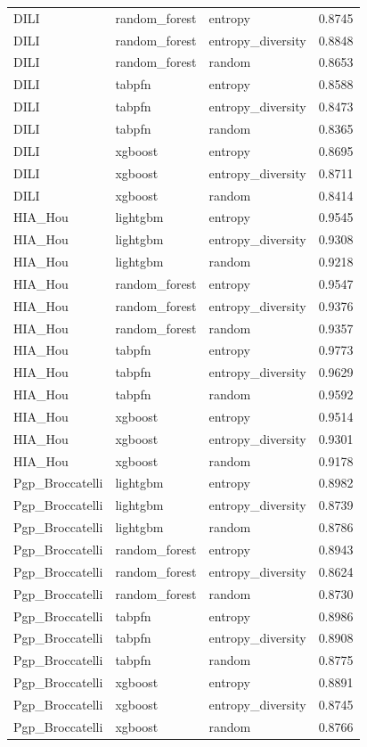 \begin{tabular}{lllr}
DILI & random_forest & entropy & 0.8745 \\
DILI & random_forest & entropy_diversity & 0.8848 \\
DILI & random_forest & random & 0.8653 \\
DILI & tabpfn & entropy & 0.8588 \\
DILI & tabpfn & entropy_diversity & 0.8473 \\
DILI & tabpfn & random & 0.8365 \\
DILI & xgboost & entropy & 0.8695 \\
DILI & xgboost & entropy_diversity & 0.8711 \\
DILI & xgboost & random & 0.8414 \\
HIA_Hou & lightgbm & entropy & 0.9545 \\
HIA_Hou & lightgbm & entropy_diversity & 0.9308 \\
HIA_Hou & lightgbm & random & 0.9218 \\
HIA_Hou & random_forest & entropy & 0.9547 \\
HIA_Hou & random_forest & entropy_diversity & 0.9376 \\
HIA_Hou & random_forest & random & 0.9357 \\
HIA_Hou & tabpfn & entropy & 0.9773 \\
HIA_Hou & tabpfn & entropy_diversity & 0.9629 \\
HIA_Hou & tabpfn & random & 0.9592 \\
HIA_Hou & xgboost & entropy & 0.9514 \\
HIA_Hou & xgboost & entropy_diversity & 0.9301 \\
HIA_Hou & xgboost & random & 0.9178 \\
Pgp_Broccatelli & lightgbm & entropy & 0.8982 \\
Pgp_Broccatelli & lightgbm & entropy_diversity & 0.8739 \\
Pgp_Broccatelli & lightgbm & random & 0.8786 \\
Pgp_Broccatelli & random_forest & entropy & 0.8943 \\
Pgp_Broccatelli & random_forest & entropy_diversity & 0.8624 \\
Pgp_Broccatelli & random_forest & random & 0.8730 \\
Pgp_Broccatelli & tabpfn & entropy & 0.8986 \\
Pgp_Broccatelli & tabpfn & entropy_diversity & 0.8908 \\
Pgp_Broccatelli & tabpfn & random & 0.8775 \\
Pgp_Broccatelli & xgboost & entropy & 0.8891 \\
Pgp_Broccatelli & xgboost & entropy_diversity & 0.8745 \\
Pgp_Broccatelli & xgboost & random & 0.8766 \\
\bottomrule
\end{tabular}
